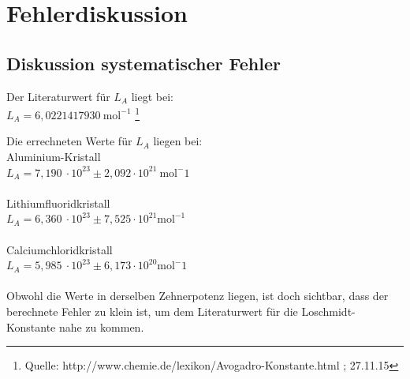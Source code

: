 \documentclass[12pt,a4paper,titlepage,headinclude,bibtotoc]{scrartcl}
\begin{document}
\section{Fehlerdiskussion}
\subsection{Diskussion systematischer Fehler}

Der Literaturwert für $L_A$ liegt bei:\\


$  L_A = 6,0221417930 \ \mathrm{mol^{-1}} $ \footnote{Quelle: http://www.chemie.de/lexikon/Avogadro-Konstante.html ; 27.11.15}

\vspace{3mm}
Die errechneten Werte für $L_A$ liegen bei:\\
\vspace{3mm}
   Aluminium-Kristall\\
 \quad $ L_A= 7,190 \ \cdot 10^{23}  \pm 2,092\cdot10^{21} \ \mathrm{mol^-1} $\\
   \\
 Lithiumfluoridkristall\\
\quad $ L_A = 6,360 \ \cdot 10^{23} \pm 7,525 \cdot 10^{21} \mathrm{mol^{-1}} $\\
 \\
 Calciumchloridkristall\\
 \quad $L_A = 5,985 \ \cdot 10^{23} \pm 6,173 \cdot 10^{20} \mathrm{mol^-1}$\\
 \\


Obwohl die Werte in derselben Zehnerpotenz liegen, ist doch sichtbar, dass der berechnete Fehler zu klein ist, um dem Literaturwert für die Loschmidt-Konstante nahe zu kommen.
\end{document}
